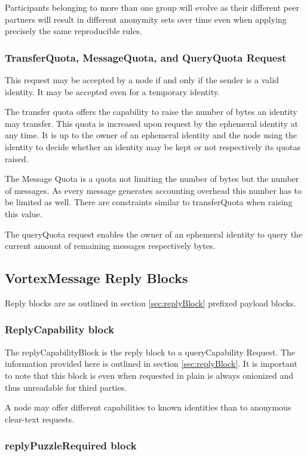 Participants belonging to more than one group will evolve as their different peer partners will result in different anonymity sets over time even when applying precisely the same reproducible rules.

\subsubsection{TransferQuota, MessageQuota,  and QueryQuota Request}
This request may be accepted by a node if and only if the sender is a valid identity. It may be accepted even for a temporary identity.

The transfer quota offers the capability to raise the number of bytes an identity may transfer. This quota is increased upon request by the ephemeral identity at any time. It is up to the owner of an ephemeral identity and the node using the identity to decide whether an identity may be kept or not respectively its quotas raised.

The Message Quota is a quota not limiting the number of bytes but the number of messages. As every message generates accounting overhead this number has to be limited as well. There are constraints similar to transferQuota when raising this value.

The queryQuota request enables the owner of an ephemeral identity to query the current amount of remaining messages respectively bytes.

\subsection{VortexMessage Reply Blocks}
Reply blocks are as outlined in section \ref{sec:replyBlock} prefixed payload blocks. 

\subsubsection{ReplyCapability block}
The replyCapabilityBlock is the reply block to a queryCapability Request. The information provided here is outlined in section \ref{sec:replyBlock}. It is important to note that this block is even when requested in plain is always onionized and thus unreadable for third parties. 

A node may offer different capabilities to known identities than to anonymous clear-text requests.

\subsubsection{replyPuzzleRequired block}


